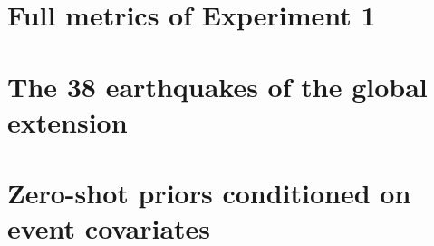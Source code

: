 \section{Full metrics of Experiment 1}
{\small}

\section{The 38 earthquakes of the global extension}
{\small}

\section{Zero-shot priors conditioned on event covariates}

